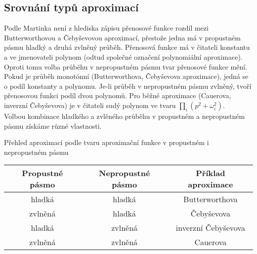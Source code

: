 \subsection{Srovnání typů aproximací}
Podle Martinka \cite{10} není z hlediska zápisu přenosové funkce rozdíl mezi Butterworthovou a Čebyševovou aproximací, přestože jedna má v propustném pásmu hladký a druhá zvlněný průběh. Přenosová funkce má v čitateli konstantu a ve jmenovateli polynom (odtud společné označení polynomiální aproximace).\\
Oproti tomu volba průběhu v nepropustném pásmu tvar přenosové funkce mění. Pokud je průběh monotónní (Butterworthova, Čebyševova aproximace), jedná se o podíl konstanty a polynomu. Je-li průběh v nepropustném pásmu zvlněný, tvoří přenosovou funkci podíl dvou polynomů. Pro běžné aproximace (Cauerova, inverzní Čebyševova) je v čitateli sudý polynom ve tvaru $\prod _{i} (p^2 + \omega_i^2)$.\\
Volbou kombinace hladkého a zvlěného průběhu v propustném a nepropustném pásmu získáme různé vlastnosti.\\
\newpage
 \begin{table}[h]
 \caption[Přehled aproximací podle tvaru aproximační funkce v propustném i nepropustném pásmu]{\label{tab:Přehled aproximací podle tvaru aproximační funkce v propustném i nepropustném pásmu}Přehled aproximací podle tvaru aproximační funkce v propustném i nepropustném pásmu \cite{10}}
  \end{table}
\begin{center}
\begin{table}[h]
\centering
  \begin{tabular}{ | c | c | c | }
    \hline
    Propustné pásmo & Nepropustné pásmo & Příklad aproximace \\ \hline
    hladká & hladká & Butterworthova \\ \hline
    zvlněná & hladká & Čebyševova \\ \hline
    hladká & zvlněná & inverzní Čebyševova \\ \hline
    zvlněná & zvlněná & Cauerova \\ \hline
  \end{tabular}
   \end{table}
   \end{center}